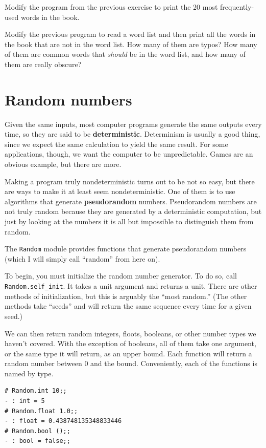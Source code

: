 \documentclass[10pt]{book}
\begin{document}
\begin{ex}
Modify the program from the previous exercise to print the
20 most frequently-used words in the book.
\end{ex}


\begin{ex}
Modify the previous program to read a word list and then print all the words in the book that
are not in the word list.  How many of them are typos?  How many of
them are common words that {\em should} be in the word list, and how
many of them are really obscure?
\end{ex}


\section{Random numbers}


Given the same inputs, most computer programs generate the same
outputs every time, so they are said to be {\bf deterministic}.
Determinism is usually a good thing, since we expect the same
calculation to yield the same result.  For some applications, though,
we want the computer to be unpredictable.  Games are an obvious
example, but there are more.

Making a program truly nondeterministic turns out to be not so easy,
but there are ways to make it at least seem nondeterministic.  One of
them is to use algorithms that generate {\bf pseudorandom} numbers.
Pseudorandom numbers are not truly random because they are generated
by a deterministic computation, but just by looking at the numbers it
is all but impossible to distinguish them from random.


The {\tt Random} module provides functions that generate
pseudorandom numbers (which I will simply call ``random'' from
here on).


To begin, you must initialize the random number generator. To do so, 
call {\tt Random.self\_init}. It takes a unit argument and returns a 
unit. There are other methods of initialization, but this is arguably
the ``most random.'' (The other methods take ``seeds'' and will return 
the same sequence every time for a given seed.)

We can then return random integers, floots, booleans, or other number types we haven't covered. With the exception of booleans, all of them take one argument, or the same type it will return, as an upper bound. Each function will return a random number between 0 and the bound. Conveniently, each of the functions is named by type.
\beforeverb
\begin{verbatim}
# Random.int 10;;
- : int = 5
# Random.float 1.0;;
- : float = 0.438748135348833446
# Random.bool ();;
- : bool = false;;
\end{verbatim}
\afterverb
\end{document}
